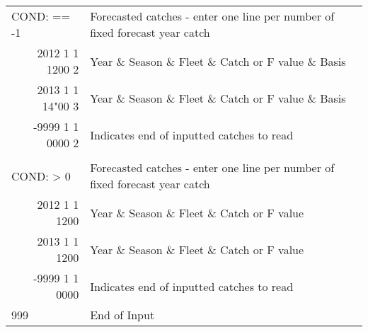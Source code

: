 \begin{landscape}
\begin{longtable}{p{3cm} p{7cm} p{11cm}}
  \hline
  \multicolumn{1}{l}{COND: == -1 }& \multicolumn{2}{l}{Forecasted catches - enter one line per number of fixed forecast year catch }\\
  \multicolumn{1}{r}{2012 1 1 1200 2}  & \multicolumn{2}{l}{Year \& Season \& Fleet \& Catch or F value \& Basis}  \\
  \multicolumn{1}{r}{2013 1 1 14"00 3}  & \multicolumn{2}{l}{Year \& Season \& Fleet \& Catch or F value \& Basis}  \\
  \multicolumn{1}{r}{-9999 1 1 0000 2}  & \multicolumn{2}{l}{Indicates end of inputted catches to read}  \\
  \\
  \multicolumn{1}{l}{COND: > 0 }& \multicolumn{2}{l}{Forecasted catches - enter one line per number of fixed forecast year catch }\\
  \multicolumn{1}{r}{2012  1 1 1200}  & \multicolumn{2}{l}{Year \& Season \& Fleet \& Catch or F value}  \\
  \multicolumn{1}{r}{2013  1 1 1200}  & \multicolumn{2}{l}{Year \& Season \& Fleet \& Catch or F value}  \\
  \multicolumn{1}{r}{-9999 1 1 0000}  & \multicolumn{2}{l}{Indicates end of inputted catches to read}  \\
  
  \hline
  999 & End of Input & \\

  \end{longtable}
\end{landscape}